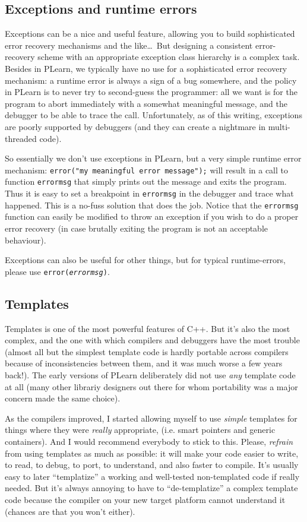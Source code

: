 \documentclass[11pt]{book}
\begin{document}
\subsection*{Exceptions and runtime errors}
 Exceptions can be a nice and useful feature, allowing you to build
sophisticated error recovery mechanisms and the like\ldots\ But
designing a consistent error-recovery scheme with an appropriate
exception class hierarchy is a complex task. Besides in PLearn, we
typically have no use for a sophisticated error recovery mechanism:
a runtime error is always a sign of a bug somewhere, and the policy
in PLearn is to never try to second-guess the programmer: all we want
is for the program to abort immediately with a somewhat meaningful
message, and the debugger to be able to trace the call. Unfortunately,
as of this writing, exceptions are poorly supported by debuggers
(and they can create a nightmare in multi-threaded code).

 So essentially we don't use exceptions in PLearn, but a very simple
runtime error mechanism: \texttt{error("my meaningful error message");}
will result in a call to function {\tt errormsg} that simply prints out
the message and exits the program. Thus it is easy to set a breakpoint
in {\tt errormsg} in the debugger and trace what happened. This is
a no-fuss solution that does the job. Notice that the {\tt errormsg}
function can easily be modified to throw an exception if you wish to
do a proper error recovery (in case brutally exiting the program is
not an acceptable behaviour).

 Exceptions can also be useful for other things, but for typical
runtime-errors, please use {\tt error(\emph{errormsg})}.

\subsection*{Templates}
 Templates is one of the most powerful features of C++. But it's also
the most complex, and the one with which compilers and debuggers
have the most trouble (almost all but the simplest template code is
hardly portable across compilers because of inconsistencies between
them, and it was much worse a few years back!). The early versions
of PLearn deliberately did not use \emph{any} template code at all
(many other librariy designers out there for whom portability was a
major concern made the same choice).

 As the compilers improved, I started allowing myself to use
\emph{simple} templates for things where they were \emph{really}
appropriate, (i.e. smart pointers and generic containers). And I
would recommend everybody to stick to this. Please, \emph{refrain}
from using templates as much as possible: it will make your code
easier to write, to read, to debug, to port, to understand, and
also faster to compile. It's usually easy to later ``templatize'' a
working and well-tested non-templated code if really needed. But it's
always annoying to have to ``de-templatize'' a complex template code
because the compiler on your new target platform cannot understand it
(chances are that you won't either).
\end{document}
